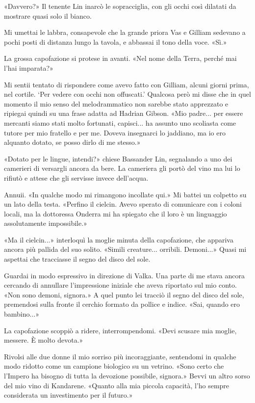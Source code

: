«Davvero?» Il tenente Lin inarcò le sopracciglia, con gli occhi così
dilatati da mostrare quasi solo il bianco.

Mi umettai le labbra, consapevole che la grande priora Vas e Gilliam
sedevano a pochi posti di distanza lungo la tavola, e abbassai il tono
della voce. «Sì.»

La grossa capofazione si protese in avanti. «Nel nome della Terra,
perché mai l'hai imparata?»

Mi sentii tentato di rispondere come avevo fatto con Gilliam, alcuni
giorni prima, nel cortile. `Per vedere con occhi non offuscati.'
Qualcosa però mi disse che in quel momento il mio senso del
melodrammatico non sarebbe stato apprezzato e ripiegai quindi su una
frase adatta ad Hadrian Gibson. «Mio padre... per essere mercanti siamo
stati molto fortunati, capisci... ha assunto uno scoliasta come tutore
per mio fratello e per me. Doveva insegnarci lo jaddiano, ma io ero
alquanto dotato, se posso dirlo di me stesso.»

«Dotato per le lingue, intendi?» chiese Bassander Lin, segnalando a uno
dei camerieri di versargli ancora da bere. La cameriera gli portò del
vino ma lui lo rifiutò e attese che gli servisse invece dell'acqua.

Annuii. «In qualche modo mi rimangono incollate qui.» Mi battei un
colpetto su un lato della testa. «Perfino il cielcin. Avevo sperato di
comunicare con i coloni locali, ma la dottoressa Onderra mi ha spiegato
che il loro è un linguaggio assolutamente impossibile.»

«Ma il cielcin...» interloquì la moglie minuta della capofazione, che
appariva ancora più pallida del suo solito. «Simili creature...
orribili. Demoni...» Quasi mi aspettai che tracciasse il segno del disco
del sole.

Guardai in modo espressivo in direzione di Valka. Una parte di me stava
ancora cercando di annullare l'impressione iniziale che aveva riportato
sul mio conto. «Non sono demoni, signora.» A quel punto lei tracciò il
segno del disco del sole, premendosi sulla fronte il cerchio formato da
pollice e indice. «Sai, quando ero bambino...»

La capofazione scoppiò a ridere, interrompendomi. «Devi scusare mia
moglie, messere. È molto devota.»

Rivolsi alle due donne il mio sorriso più incoraggiante, sentendomi in
qualche modo ridotto come un campione biologico su un vetrino. «Sono
certo che l'Impero ha bisogno di tutta la devozione possibile, signora.»
Bevvi un altro sorso del mio vino di Kandarene. «Quanto alla mia piccola
capacità, l'ho sempre considerata un investimento per il futuro.»

